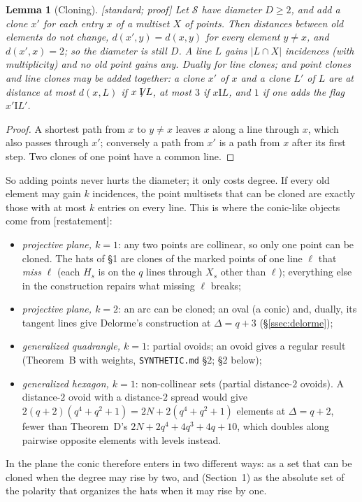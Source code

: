 \documentclass[11pt]{amsart}
\newtheorem{lemma}[theorem]{Lemma}
\theoremstyle{definition}
\theoremstyle{remark}
\newcommand{\I}{\mathrel{\mathrm{I}}}
\newcommand{\nI}{\mathrel{\not\mathrel{\mathrm{I}}}}
\newcommand{\cS}{\mathcal{S}}
\newcommand{\status}[1]{\textup{[#1]}}
\begin{document}
\begin{lemma}[Cloning]\label{lem:clone}
\status{standard; proof} Let $\cS$ have diameter $D\ge2$, and add a clone $x'$ for each entry $x$ of a multiset $X$ of
points. Then distances between old elements do not change, $d(x',y)=d(x,y)$ for every element $y\ne x$, and
$d(x',x)=2$; so the diameter is still $D$. A line $L$ gains $|L\cap X|$ incidences (with multiplicity) and no old
point gains any. Dually for line clones; and point clones and line clones may be added together: a clone $x'$ of $x$
and a clone $L'$ of $L$ are at distance at most $d(x,L)$ if $x\nI L$, at most $3$ if $x\I L$, and $1$ if one adds the
flag $x'\I L'$.
\end{lemma}
\begin{proof}
A shortest path from $x$ to $y\ne x$ leaves $x$ along a line through $x$, which also passes through $x'$; conversely
a path from $x'$ is a path from $x$ after its first step. Two clones of one point have a common line.
\end{proof}

So adding points never hurts the diameter; it only costs degree. If every old element may gain $k$ incidences, the
point multisets that can be cloned are exactly those with at most $k$ entries on every line. This is where the
conic-like objects come from \status{restatement}:
\begin{itemize}
\item \emph{projective plane, $k=1$}: any two points are collinear, so only one point can be cloned. The hats of
\S1 are clones of the marked points of one line $\ell$ that \emph{miss} $\ell$ (each $H_s$ is on the $q$ lines through
$X_s$ other than $\ell$); everything else in the construction repairs what missing $\ell$ breaks;
\item \emph{projective plane, $k=2$}: an arc can be cloned; an oval (a conic) and, dually, its tangent lines give
Delorme's construction at $\Delta=q+3$ (\S\ref{ssec:delorme});
\item \emph{generalized quadrangle, $k=1$}: partial ovoids; an ovoid gives a regular result (Theorem~B with weights,
\texttt{SYNTHETIC.md} \S2; \S2 below);
\item \emph{generalized hexagon, $k=1$}: non-collinear sets (partial distance-$2$ ovoids). A distance-$2$ ovoid with
a distance-$2$ spread would give $2(q+2)(q^4+q^2+1)=2N+2(q^4+q^2+1)$ elements at $\Delta=q+2$, fewer than Theorem~D's
$2N+2q^4+4q^3+4q+10$, which doubles along pairwise opposite elements with levels instead.
\end{itemize}
In the plane the conic therefore enters in two different ways: as a set that can be cloned when the degree may rise by
two, and (Section~1) as the absolute set of the polarity that organizes the hats when it may rise by one.
\end{document}
